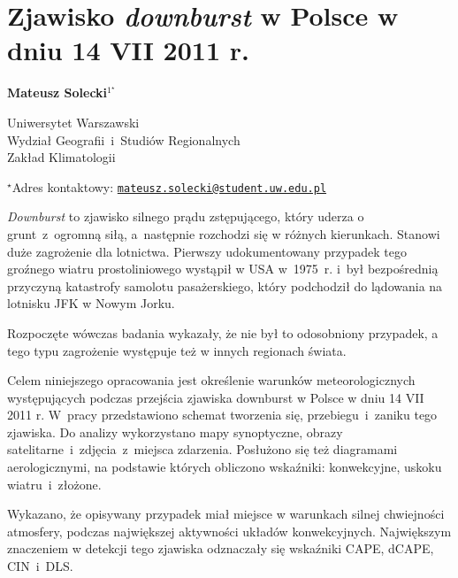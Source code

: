 \documentclass[\main/boa.tex]{subfiles}
\begin{document}
\section{Zjawisko \emph{downburst} w Polsce w dniu 14 VII 2011 r.}

\begin{center}
  {\bf {} Mateusz Solecki$^{1^\star}$}
\end{center}

\vskip 0.3cm

\begin{affiliations}
\begin{enumerate}
\begin{minipage}{0.915\textwidth}
\centering
\item Uniwersytet Warszawski\\ Wydział Geografii~i~Studiów Regionalnych\\ Zakład Klimatologii\\[-2pt]
\end{minipage}
\end{enumerate}
$^\star$Adres kontaktowy: \href{mailto:mateusz.solecki@student.uw.edu.pl}{\nolinkurl{mateusz.solecki@student.uw.edu.pl}}\\
\end{affiliations}

\vskip 0.5cm


\vskip 0.5cm

\emph{Downburst} to zjawisko silnego prądu zstępującego, który uderza o grunt~z~ogromną siłą, a następnie rozchodzi się w różnych kierunkach. Stanowi duże zagrożenie dla lotnictwa. Pierwszy udokumentowany przypadek tego groźnego wiatru prostoliniowego wystąpił 
w USA w 1975 r. i~był bezpośrednią przyczyną katastrofy samolotu pasażerskiego, który podchodził do lądowania na lotnisku JFK w Nowym Jorku. 

Rozpoczęte wówczas badania wykazały, że nie był to odosobniony przypadek, a tego typu zagrożenie występuje też w innych regionach świata.

Celem niniejszego opracowania jest określenie warunków meteorologicznych występujących podczas przejścia zjawiska downburst w Polsce w dniu 14 VII 2011 r. W pracy przedstawiono schemat tworzenia się, przebiegu~i~zaniku tego zjawiska.  Do analizy wykorzystano mapy synoptyczne, obrazy satelitarne~i~zdjęcia~z~miejsca zdarzenia. Posłużono się też diagramami aerologicznymi, na podstawie których obliczono wskaźniki: konwekcyjne, uskoku wiatru~i~złożone.

Wykazano, że opisywany przypadek miał miejsce w warunkach silnej chwiejności atmosfery, podczas największej aktywności układów konwekcyjnych. Największym znaczeniem w detekcji tego zjawiska odznaczały się wskaźniki CAPE, dCAPE, CIN~i~DLS. 
\end{document}
